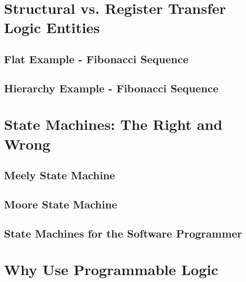 \section{Structural vs. Register Transfer Logic Entities}
\subsection{Flat Example - Fibonacci Sequence}
\subsection{Hierarchy Example - Fibonacci Sequence}

\section{State Machines: The Right and Wrong}
\subsection{Meely State Machine}
\subsection{Moore State Machine}
\subsection{State Machines for the Software Programmer}

\section{Why Use Programmable Logic}
